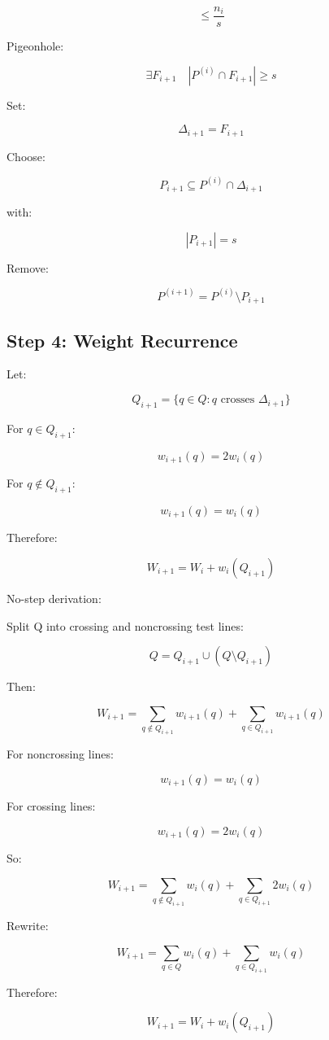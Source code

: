 \documentclass[
  11pt,
]{article}
\begin{document}
\[
\le \frac{n_i}{s}
\]

Pigeonhole:

\[
\exists F_{i+1} \quad |P^{(i)}\cap F_{i+1}|\ge s
\]

Set:

\[
\Delta_{i+1}=F_{i+1}
\]

Choose:

\[
P_{i+1}\subseteq P^{(i)}\cap\Delta_{i+1}
\]

with:

\[
|P_{i+1}|=s
\]

Remove:

\[
P^{(i+1)}=P^{(i)}\setminus P_{i+1}
\]

\hypertarget{step-4-weight-recurrence}{%
\subsection{Step 4: Weight Recurrence}\label{step-4-weight-recurrence}}

Let:

\[
Q_{i+1}=\lbrace q\in Q:q\text{ crosses }\Delta_{i+1} \rbrace
\]

For \(q\in Q_{i+1}\):

\[
w_{i+1}(q)=2w_i(q)
\]

For \(q\notin Q_{i+1}\):

\[
w_{i+1}(q)=w_i(q)
\]

Therefore:

\[
W_{i+1} = W_i+w_i(Q_{i+1})
\]

No-step derivation:

Split Q into crossing and noncrossing test lines:

\[
Q=Q_{i+1}\cup(Q\setminus Q_{i+1})
\]

Then:

\[
W_{i+1} = \sum_{q\notin Q_{i+1}}w_{i+1}(q) + \sum_{q\in Q_{i+1}}w_{i+1}(q)
\]

For noncrossing lines:

\[
w_{i+1}(q)=w_i(q)
\]

For crossing lines:

\[
w_{i+1}(q)=2w_i(q)
\]

So:

\[
W_{i+1} = \sum_{q\notin Q_{i+1}}w_i(q) + \sum_{q\in Q_{i+1}}2w_i(q)
\]

Rewrite:

\[
W_{i+1} = \sum_{q\in Q}w_i(q) + \sum_{q\in Q_{i+1}}w_i(q)
\]

Therefore:

\[
W_{i+1}=W_i+w_i(Q_{i+1})
\]
\end{document}
